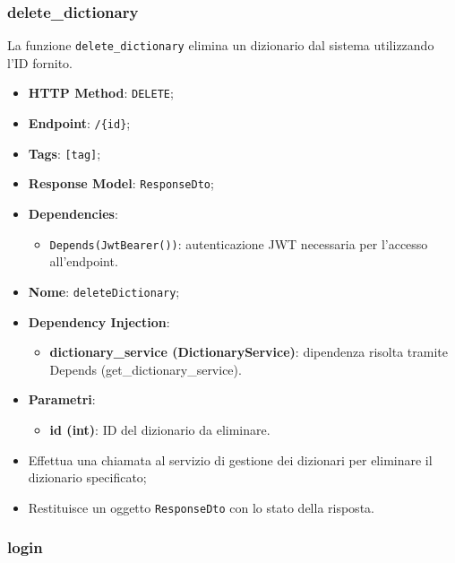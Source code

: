 \subsubsection{delete\_dictionary}

\par La funzione \texttt{delete\_dictionary} elimina un dizionario dal sistema utilizzando l'ID fornito.

  \begin{itemize}
  \item \textbf{HTTP Method}: \texttt{DELETE};
  \item \textbf{Endpoint}: \texttt{/\{id\}};
  \item \textbf{Tags}: \texttt{[tag]};
  \item \textbf{Response Model}: \texttt{ResponseDto};
  \item \textbf{Dependencies}:
  \begin{itemize}
    \item \texttt{Depends(JwtBearer())}: autenticazione JWT necessaria per l'accesso all'endpoint.
  \end{itemize}
  \item \textbf{Nome}: \texttt{deleteDictionary};
  \item \textbf{Dependency Injection}:
  \begin{itemize}
    \item \textbf{dictionary\_service (DictionaryService)}: dipendenza risolta tramite Depends (get\_dictionary\_service).
  \end{itemize}
  \item \textbf{Parametri}:
  \begin{itemize}
    \item \textbf{id (int)}: ID del dizionario da eliminare.
  \end{itemize}
\end{itemize}

\begin{itemize}
  \item Effettua una chiamata al servizio di gestione dei dizionari per eliminare il dizionario specificato;
  \item Restituisce un oggetto \texttt{ResponseDto} con lo stato della risposta.
\end{itemize}


\subsubsection{login}

